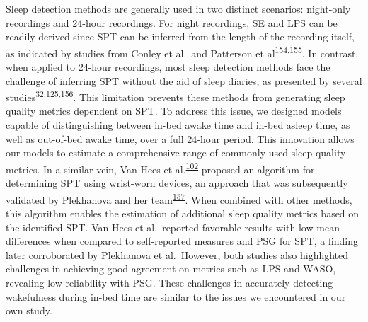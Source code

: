 \documentclass[
  9pt,
]{scrbook}
\begin{document}
Sleep detection methods are generally used in two distinct scenarios:
night-only recordings and 24-hour recordings. For night recordings, SE
and LPS can be readily derived since SPT can be inferred from the length
of the recording itself, as indicated by studies from Conley et al.~and
Patterson et
al\textsuperscript{\protect\hyperlink{ref-conley_agreement_2019}{154},\protect\hyperlink{ref-patterson_40_2023}{155}}.
In contrast, when applied to 24-hour recordings, most sleep detection
methods face the challenge of inferring SPT without the aid of sleep
diaries, as presented by several
studies\textsuperscript{\protect\hyperlink{ref-girschik_validation_2012}{32},\protect\hyperlink{ref-doherty_large_2017}{125},\protect\hyperlink{ref-anderson_assessment_2014}{156}}.
This limitation prevents these methods from generating sleep quality
metrics dependent on SPT. To address this issue, we designed models
capable of distinguishing between in-bed awake time and in-bed asleep
time, as well as out-of-bed awake time, over a full 24-hour period. This
innovation allows our models to estimate a comprehensive range of
commonly used sleep quality metrics. In a similar vein, Van Hees et
al.\textsuperscript{\protect\hyperlink{ref-van_hees_estimating_2018}{102}}
proposed an algorithm for determining SPT using wrist-worn devices, an
approach that was subsequently validated by Plekhanova and her
team\textsuperscript{\protect\hyperlink{ref-plekhanova_validation_2023}{157}}.
When combined with other methods, this algorithm enables the estimation
of additional sleep quality metrics based on the identified SPT. Van
Hees et al.~reported favorable results with low mean differences when
compared to self-reported measures and PSG for SPT, a finding later
corroborated by Plekhanova et al.~However, both studies also highlighted
challenges in achieving good agreement on metrics such as LPS and WASO,
revealing low reliability with PSG. These challenges in accurately
detecting wakefulness during in-bed time are similar to the issues we
encountered in our own study.
\end{document}
